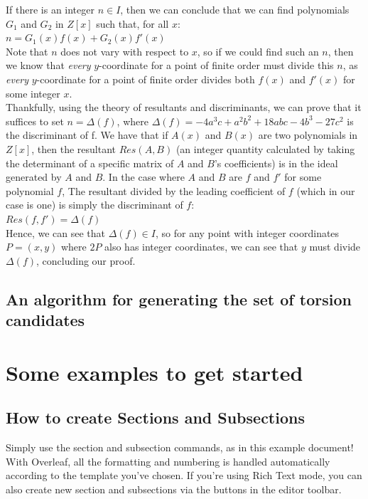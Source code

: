 \documentclass{article}
\begin{document}
If there is an integer $n \in I$, then we can conclude that we can find polynomials $G_1$ and $G_2$ in $Z[x]$ such that, for all $x$:\\

$n = G_1(x)f(x) + G_2(x)f'(x)$\\

Note that $n$ does not vary with respect to $x$, so if we could find such an $n$, then we know that \emph{every} $y$-coordinate for a point of finite order must divide this $n$, as \emph{every} $y$-coordinate for a point of finite order divides both $f(x)$ and $f'(x)$ for some integer $x$.\\

Thankfully, using the theory of resultants and discriminants, we can prove that it suffices to set $n = \Delta(f)$, where $\Delta(f) = -4a^3c + a^2b^2 + 18abc - 4b^3 - 27c^2$ is the discriminant of f. We have that if $A(x)$ and $B(x)$ are two polynomials in $Z[x]$, then the resultant $Res(A, B)$ (an integer quantity calculated by taking the determinant of a specific matrix of $A$ and $B$'s coefficients) is in the ideal generated by $A$ and $B$. In the case where $A$ and $B$ are $f$ and $f'$ for some polynomial $f$, The resultant divided by the leading coefficient of $f$ (which in our case is one) is simply the discriminant of $f$: \\

$Res(f, f') = \Delta(f)$\\

Hence, we can see that $\Delta(f) \in I$, so for any point with integer coordinates $P = (x, y)$ where $2P$ also has integer coordinates, we can see that $y$ must divide $\Delta(f)$, concluding our proof.


\subsection{An algorithm for generating the set of torsion candidates}

\newpage

\section{Some examples to get started}

\subsection{How to create Sections and Subsections}

Simply use the section and subsection commands, as in this example document! With Overleaf, all the formatting and numbering is handled automatically according to the template you've chosen. If you're using Rich Text mode, you can also create new section and subsections via the buttons in the editor toolbar.
\end{document}
